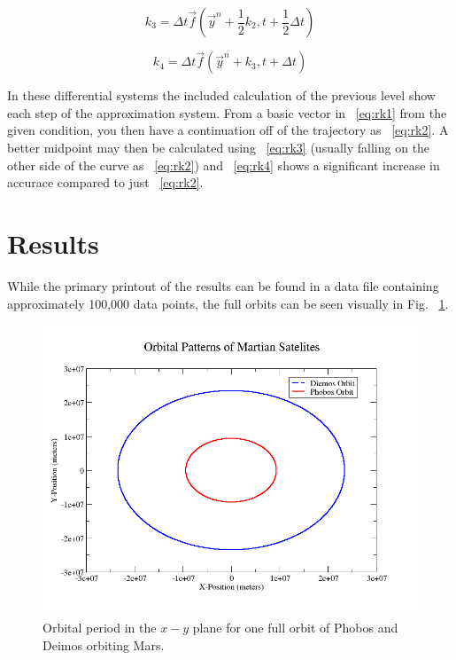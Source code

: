 \documentclass[11pt]{article}
\begin{document}
\begin{equation}
\label{eq:rk3}
k_{3}= \Delta t\vec{f}(\vec{y}^{n} + \frac{1}{2}k_{2},t + \frac{1}{2}\Delta t)
\end{equation}

\begin{equation}
\label{eq:rk4}
k_{4}= \Delta t\vec{f}(\vec{y}^{n} + k_{3}, t + \Delta t)
\end{equation}

\noindent In these differential systems the included calculation of the previous level show each step of the approximation system. From a basic vector in ~\eqref{eq:rk1} from the given condition, you then have a continuation off of the trajectory as ~\eqref{eq:rk2}. A better midpoint may then be calculated using ~\eqref{eq:rk3} (usually falling on the other side of the curve as ~\eqref{eq:rk2}) and ~\eqref{eq:rk4} shows a significant increase in accurace compared to just ~\eqref{eq:rk2}.

\section{Results}
\noindent While the primary printout of the results can be found in a data file containing approximately 100,000 data points, the full orbits can be seen visually in Fig. ~\ref{fig:orbit-diagram}.
\begin{figure}[ht]
\centering
\includegraphics[width=1.0\textwidth, angle =0]{../images/orbits}
\caption{Orbital period in the $x-y$ plane for one full orbit of Phobos and Deimos orbiting Mars.}
\label{fig:orbit-diagram}
\end{figure}
\end{document}
